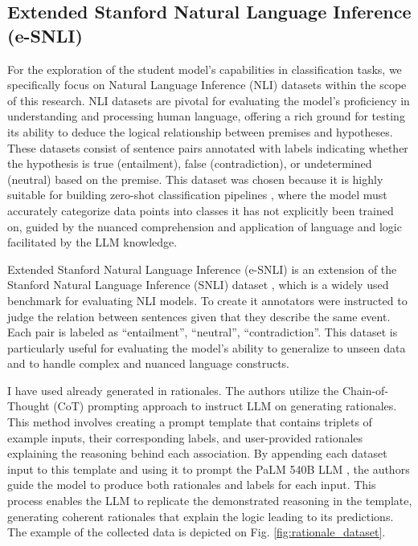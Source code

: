 \subsection{Extended Stanford Natural Language Inference (e-SNLI)}
\label{sec:esnli}

For the exploration of the student model's capabilities in classification tasks, we specifically focus on Natural Language Inference (NLI) datasets within the scope of this research. NLI datasets are pivotal for evaluating the model's proficiency in understanding and processing human language, offering a rich ground for testing its ability to deduce the logical relationship between premises and hypotheses. These datasets consist of sentence pairs annotated with labels indicating whether the hypothesis is true (entailment), false (contradiction), or undetermined (neutral) based on the premise. This dataset was chosen because it is highly suitable for building zero-shot classification pipelines \cite{zeroshotclf}, where the model must accurately categorize data points into classes it has not explicitly been trained on, guided by the nuanced comprehension and application of language and logic facilitated by the LLM knowledge.

Extended Stanford Natural Language Inference (e-SNLI) \cite{esnli} is an extension of the Stanford Natural Language Inference (SNLI) dataset \cite{snli}, which is a widely used benchmark for evaluating NLI models. To create it annotators were instructed to judge the relation between sentences given that they describe the same event. Each pair is labeled as ``entailment'', ``neutral'', ``contradiction''. This dataset is particularly useful for evaluating the model's ability to generalize to unseen data and to handle complex and nuanced language constructs.

I have used already generated in \cite{stepbystep} rationales. The authors utilize the Chain-of-Thought (CoT) \cite{cot} prompting approach to instruct LLM on generating rationales. This method involves creating a prompt template that contains triplets of example inputs, their corresponding labels, and user-provided rationales explaining the reasoning behind each association. By appending each dataset input to this template and using it to prompt the PaLM 540B LLM \cite{palm}, the authors guide the model to produce both rationales and labels for each input. This process enables the LLM to replicate the demonstrated reasoning in the template, generating coherent rationales that explain the logic leading to its predictions. The example of the collected data is depicted on Fig. \ref{fig:rationale_dataset}.

